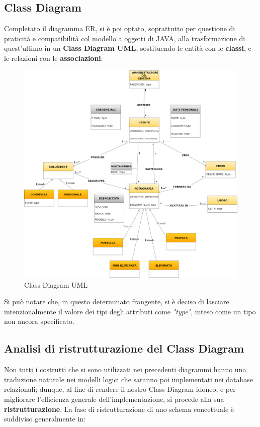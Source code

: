 \documentclass[a4paper]{article}
\begin{document}
	\vspace{35pt}
	\subsection{Class Diagram}
	\vspace{8pt}
	Completato il diagramma ER, si è  poi optato,
	soprattutto per questione di praticità e compatibilità
	col modello a oggetti di JAVA, alla trasformazione di
	quest'ultimo in un\textbf{ Class Diagram UML},
	sostituendo le
	entità con le \textbf{classi}, e le relazioni con le
	\textbf{associazioni}:
	
		\begin{figure}[H]
        \begin{center}
            \includegraphics[scale=0.20]{Immagini/Galleria_Fotografica_UML}
            \caption{Class Diagram UML}
        \end{center}
	\end{figure}
	Si può notare che, in questo determinato frangente,
	si è deciso di lasciare intenzionalmente
	il valore dei tipi degli attributi come \emph{"type"},
	inteso come un tipo non ancora specificato.
	
	
	
	\vspace{35pt}
	\subsection{Analisi di ristrutturazione del Class Diagram}
	\vspace{8pt}
	Non tutti i costrutti che si sono utilizzati nei
	precedenti
	diagrammi hanno una traduzione naturale nei modelli
	logici che saranno poi implementati nei database
	relazionali; dunque,
	al fine di rendere il nostro Class Diagram idoneo, e per
	migliorare l’efficienza generale dell’implementazione, si
	procede alla sua \textbf{ristrutturazione}. La fase di
	ristrutturazione di uno schema concettuale è suddiviso
	generalmente in:
	
\end{document}
